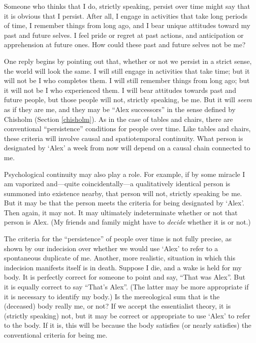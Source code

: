 \documentclass[11pt]{article}
\begin{document}
\begin{spacing}{1.5}
Someone who thinks that I do, strictly speaking, persist over time
might say that it is obvious that I persist.  After all, I engage in
activities that take long periods of time, I remember things from long
ago, and I bear unique attitudes toward my past and future selves.  I
feel pride or regret at past actions, and anticipation or apprehension
at future ones.  How could these past and future selves not be me?

One reply begins by pointing out that, whether or not we persist in a
strict sense, the world will look the same.  I will still engage in
activities that take time; but it will not be I who completes them.  I
will still remember things from long ago; but it will not be I who
experienced them.  I will bear attitudes towards past and future
people, but those people will not, strictly speaking, be me.  But it
will {\em seem} as if they are me, and they may be ``Alex successors''
in the sense defined by Chisholm (Section \ref{chisholm}).  As in the
case of tables and chairs, there are conventional ``persistence''
conditions for people over time.  Like tables and chairs, these
criteria will involve causal and spatiotemporal continuity.  What
person is designated by `Alex' a week from now will depend on a causal
chain connected to me.

Psychological continuity may also play a role.  For example, if by
some miracle I am vaporized and---quite coincidentally---a
qualitatively identical person is summoned into existence nearby, that
person will not, strictly speaking be me.  But it may be that the
person meets the criteria for being designated by `Alex'.  Then again,
it may not.  It may ultimately indeterminate whether or not that
person is Alex.  (My friends and family might have to {\em decide}
whether it is or not.)

The criteria for the ``persistence'' of people over time is not fully
precise, as shown by our indecision over whether we would use `Alex'
to refer to a spontaneous duplicate of me.  Another, more realistic,
situation in which this indecision manifests itself is in death.
Suppose I die, and a wake is held for my body.  It is perfectly
correct for someone to point and say, ``That was Alex''.  But it is
equally correct to say ``That's Alex''.  (The latter may be more
appropriate if it is necessary to identify my body.)  Is the
mereological sum that is the (deceased) body really me, or not?  If we
accept the essentialist theory, it is (strictly speaking) not, but it
may be correct or appropriate to use `Alex' to refer to the body.  If
it is, this will be because the body satisfies (or nearly satisfies)
the conventional criteria for being me.


\end{spacing}
\end{document}
